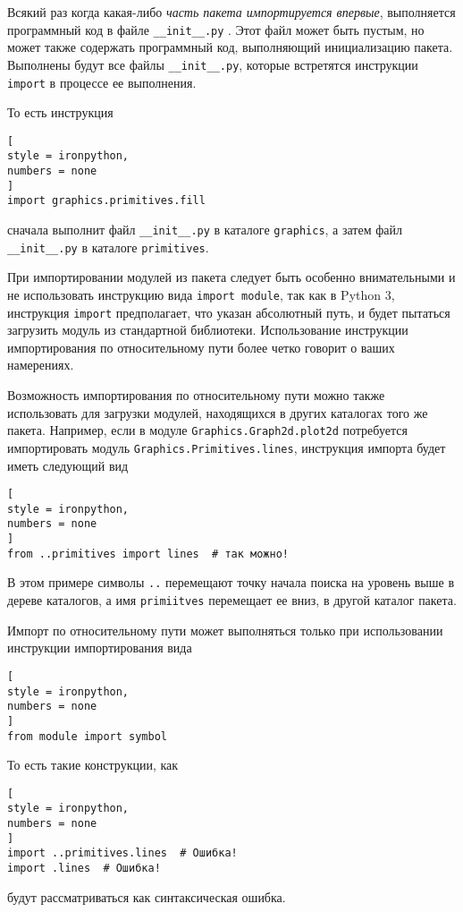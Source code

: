 \documentclass[%
	11pt,
	a4paper,
	utf8,
		]{article}
\begin{document}
Всякий раз когда какая-либо \emph{часть пакета импортируется впервые}, выполняется программный код в файле \verb|__init__.py| \cite[]{beazley:python-2010}. Этот файл может быть пустым, но может также содержать программный код, выполняющий инициализацию пакета. Выполнены будут все файлы \verb|__init__.py|, которые встретятся инструкции \texttt{import} в процессе ее выполнения.

То есть инструкция
\begin{lstlisting}[
style = ironpython,
numbers = none
]
import graphics.primitives.fill
\end{lstlisting}
сначала выполнит файл \verb|__init__.py| в каталоге \texttt{graphics}, а затем файл \verb|__init__.py| в каталоге \texttt{primitives}.

При импортировании модулей из пакета следует быть особенно внимательными и не использовать инструкцию вида \texttt{import module}, так как в Python 3, инструкция \texttt{import} предполагает, что указан абсолютный путь, и будет пытаться загрузить модуль из стандартной библиотеки. Использование инструкции импортирования по относительному пути более четко говорит о ваших намерениях.

Возможность импортирования по относительному пути можно также использовать для загрузки модулей, находящихся в других каталогах того же пакета. Например, если в модуле \texttt{Graphics.Graph2d.plot2d} потребуется импортировать модуль \texttt{Graphics.Primitives.lines}, инструкция импорта будет иметь следующий вид
\begin{lstlisting}[
style = ironpython,
numbers = none
]
from ..primitives import lines  # так можно!
\end{lstlisting}

В этом примере символы \texttt{..} перемещают точку начала поиска на уровень выше в дереве каталогов, а имя \texttt{primiitves} перемещает ее вниз, в другой каталог пакета.

Импорт по относительному пути может выполняться только при использовании инструкции импортирования вида
\begin{lstlisting}[
style = ironpython,
numbers = none
]
from module import symbol
\end{lstlisting}

То есть такие конструкции, как
\begin{lstlisting}[
style = ironpython,
numbers = none
]
import ..primitives.lines  # Ошибка!
import .lines  # Ошибка!
\end{lstlisting}
будут рассматриваться как синтаксическая ошибка.
\end{document}
